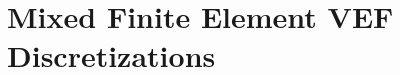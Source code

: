 \documentclass[../doc.tex]{subfiles}
\begin{document}
\chapter{Mixed Finite Element VEF Discretizations}
\end{document}
